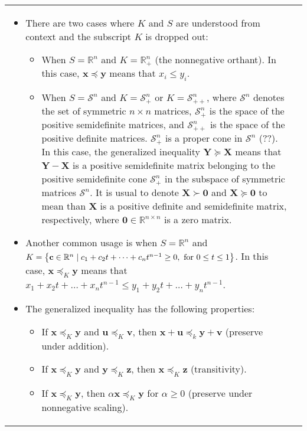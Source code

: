 \documentclass{article}
\begin{document}
\begin{table}[ht!]
\begin{tabularx}{\textwidth}{|A|C|}
\begin{itemize}[leftmargin=*]
    \item There are two cases where \(K\) and \(S\) are understood from context and the subscript \(K\) is dropped out:
        \begin{itemize}[label={$\triangleright$}]
            \item When \(S = \mathbb{R}^{n}\) and \(K = \mathbb{R}^{n}_{+}\) (the nonnegative orthant). In this case, \(\mathbf{x} \preceq \mathbf{y}\) means that \(x_i \leq y_i\).
            \item When \(S = \mathcal{S}^{n}\) and \(K = \mathcal{S}^{n}_{+}\) or \(K = \mathcal{S}^{n}_{++}\), where \(\mathcal{S}^{n}\) denotes the set of symmetric \(n\times n\) matrices, \(\mathcal{S}^{n}_{+}\) is the space of the positive semidefinite matrices, and \(\mathcal{S}^{n}_{++}\) is the space of the positive definite matrices. \(\mathcal{S}^{n}_{+}\) is a proper cone in \(\mathcal{S}^{n}\) (??). In this case, the generalized inequality \(\mathbf{Y} \succeq \mathbf{X}\) means that \(\mathbf{Y}-\mathbf{X}\) is a positive semidefinite matrix belonging to the positive semidefinite cone \(\mathcal{S}^{n}_{+}\) in the subspace of symmetric matrices \(\mathcal{S}^{n}\). It is usual to denote \(\mathbf{X} \succ \mathbf{0}\) and \(\mathbf{X} \succeq \mathbf{0}\) to mean than \(\mathbf{X}\) is a positive definite and semidefinite matrix, respectively, where \(\mathbf{0} \in \mathbb{R}^{n\times n}\) is a zero matrix.
        \end{itemize}
    \item Another common usage is when \(S = \mathbb{R}^{n}\) and \(K = \left\{ \mathbf{c} \in \mathbb{R}^{n} \mid c_1 + c_2 t + \dots + c_n t^{n-1} \geq 0, \textnormal{ for } 0\leq t\leq 1 \right\}\). In this case, \(\mathbf{x} \preceq_K \mathbf{y}\) means that \(x_1 + x_2 t + \dots + x_n t^{n-1} \leq y_1 + y_2 t + \dots + y_n t^{n-1}\).
    \item The generalized inequality has the following properties:
        \begin{itemize}[label={$\triangleright$}]
            \item If \(\mathbf{x} \preceq_K \mathbf{y}\) and \(\mathbf{u} \preceq_K \mathbf{v}\), then \(\mathbf{x} + \mathbf{u} \preceq_k \mathbf{y} + \mathbf{v}\) (preserve under addition).
            \item If \(\mathbf{x} \preceq_K \mathbf{y}\) and \(\mathbf{y} \preceq_K \mathbf{z}\), then \(\mathbf{x} \preceq_K \mathbf{z}\) (transitivity).
            \item If \(\mathbf{x}\preceq_K \mathbf{y}\), then \(\alpha\mathbf{x}\preceq_K \mathbf{y}\) for \(\alpha\geq0\) (preserve under nonnegative scaling).

\end{itemize}
\end{itemize}
\end{tabularx}
\end{table}
\end{document}
